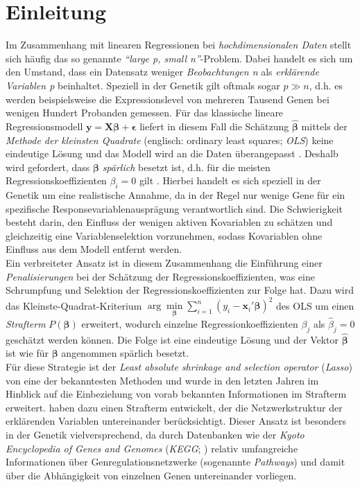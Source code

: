 \documentclass[12pt, a4paper]{report}\usepackage[]{graphicx}\usepackage[]{color}
\begin{document}
\chapter{Einleitung}
Im Zusammenhang mit linearen Regressionen bei \textit{hochdimensionalen Daten} stellt sich häufig das so genannte \textit{"`large p, small n"'}-Problem. Dabei handelt es sich um den Umstand, dass ein Datensatz weniger \textit{Beobachtungen n} als \textit{erklärende Variablen p} beinhaltet. Speziell in der Genetik gilt oftmals sogar $p \gg n$, d.h. es werden beispielsweise die Expressionslevel von mehreren Tausend Genen bei wenigen Hundert Probanden gemessen. Für das klassische lineare Regressionsmodell $\mathbf{y}=\textbf{X}\boldsymbol\beta+\boldsymbol\epsilon$ liefert in diesem Fall die Schätzung $\boldsymbol{\hat{\beta}}$ mittels der \textit{Methode der kleinsten Quadrate }(englisch: ordinary least squares; \textit{OLS}) keine eindeutige Lösung und das Modell wird an die Daten überangepasst \cite{hastie_efficient_2004}. Deshalb wird gefordert, dass $\boldsymbol{\beta}$ \textit{spärlich} besetzt ist, d.h. für die meisten Regressionskoeffizienten $\beta_i=0$ gilt \cite{buehlmann2011statistics}. Hierbei handelt es sich speziell in der Genetik um eine realistische Annahme, da in der Regel nur wenige Gene für ein spezifische Responsevariablenausprägung verantwortlich sind. Die Schwierigkeit besteht darin, den Einfluss der wenigen aktiven Kovariablen zu schätzen und gleichzeitig eine Variablenselektion vorzunehmen, sodass Kovariablen ohne Einfluss aus dem Modell entfernt werden.\\
Ein verbreiteter Ansatz ist in diesem Zusammenhang die Einführung einer \textit{Penalisierungen} bei der Schätzung der Regressionskoeffizienten, was eine Schrumpfung und Selektion der Regressionskoeffizienten zur Folge hat. Dazu wird das Kleinste-Quadrat-Kriterium $\arg\min\limits_{\boldsymbol{\beta}} \sum_{i=1}^{n}(y_i - \mathbf{x}_i' \boldsymbol{\beta})^2$ des OLS \cite{fahrmeir2009regression} um einen \textit{Strafterm} $P(\boldsymbol{\beta})$ erweitert, wodurch einzelne Regressionkoeffizienten $\beta_j$ als $\hat{\beta}_j=0$ geschätzt werden können. Die Folge ist eine eindeutige Lösung und der Vektor $\boldsymbol{\hat{\beta}}$ ist wie für $\boldsymbol{\beta}$ angenommen spärlich besetzt.\\ 
Für diese Strategie ist der \textit{Least absolute shrinkage and selection operator} (\textit{Lasso}) von  eine der bekanntesten Methoden und wurde in den letzten Jahren im Hinblick auf die Einbeziehung von vorab bekannten Informationen im Strafterm erweitert.  haben dazu einen Strafterm entwickelt, der die Netzwerkstruktur der erklärenden Variablen untereinander berücksichtigt. Dieser Ansatz ist besonders in der Genetik vielversprechend, da durch Datenbanken wie der \textit{Kyoto Encyclopedia of Genes and Genomes} (\textit{KEGG}; ) relativ umfangreiche Informationen über Genregulationsnetzwerke (sogenannte \textit{Pathways}) und damit über die Abhängigkeit von einzelnen Genen untereinander vorliegen.\\
\end{document}
